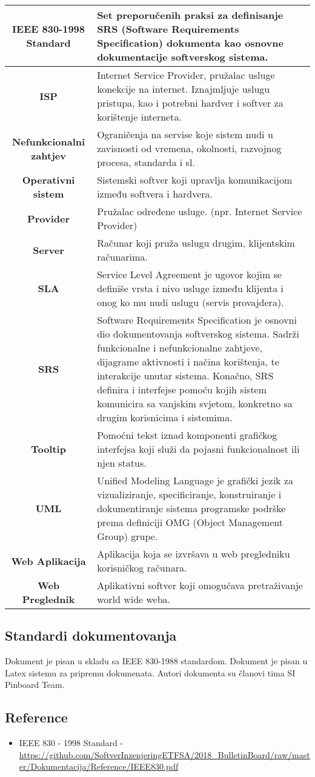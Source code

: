 \begin{center}
\begin{longtable}{|c |m{8cm} |}
        \textbf{IEEE 830-1998 Standard} & Set preporučenih praksi za definisanje SRS (Software Requirements Specification) dokumenta kao osnovne dokumentacije softverskog sistema. \\  \hline
        \textbf{ISP} & Internet Service Provider, pružalac usluge konekcije na internet. Iznajmljuje uslugu pristupa, kao i potrebni hardver i softver za korištenje interneta. \\ \hline
        \textbf{Nefunkcionalni zahtjev} & Ograničenja na servise koje sistem nudi u zavisnosti od vremena, okolnosti, razvojnog procesa, standarda i sl. \\ \hline
        \textbf{Operativni sistem} & Sistemski softver koji upravlja komunikacijom između softvera i hardvera. \\ \hline
        \textbf{Provider} & Pružalac određene usluge. (npr. Internet Service Provider) \\ \hline
        \textbf{Server} & Računar koji pruža uslugu drugim, klijentskim računarima.  \\ \hline
        \textbf{SLA} & Service Level Agreement je ugovor kojim se definiše vrsta i nivo usluge između klijenta i onog ko mu nudi uslugu (servis provajdera). \\ \hline
        \textbf{SRS} & Software Requirements Specification je osnovni dio dokumentovanja softverskog sistema. Sadrži funkcionalne i nefunkcionalne zahtjeve, dijagrame aktivnosti i načina korištenja, te interakcije unutar sistema. Konačno, SRS definira i interfejse pomoću kojih sistem komunicira sa vanjskim svjetom, konkretno sa drugim korisnicima i sistemima.\\ \hline
        \textbf{Tooltip} & Pomoćni tekst iznad komponenti grafičkog interfejsa koji služi da pojasni funkcionalnost ili njen status. \\  \hline
        \textbf{UML} & Unified Modeling Language je grafički jezik za vizualiziranje, specificiranje, konstruiranje i dokumentiranje sistema programske podrške prema definiciji OMG (Object Management Group) grupe. \\  \hline
        \textbf{Web Aplikacija} & Aplikacija koja se izvršava u web pregledniku korisničkog računara. \\ \hline
        \textbf{Web Preglednik} & Aplikativni softver koji omogućava pretraživanje world wide weba. \\ \hline
    \end{longtable}
\end{center}
\newpage
\subsection{Standardi dokumentovanja}
Dokument je pisan u skladu sa IEEE 830-1988 standardom.
Dokument je pisan u Latex sistemu za pripremu dokumenata.
Autori dokumenta su članovi tima SI Pinboard Team.
\subsection{Reference}
\begin{itemize}
  \item IEEE 830 - 1998 Standard -  \url{https://github.com/SoftverInzenjeringETFSA/2018_BulletinBoard/raw/master/Dokumentacija/Reference/IEEE830.pdf}
\end{itemize}
